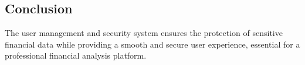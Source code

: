 \subsection{Conclusion}
The user management and security system ensures the protection of sensitive financial data while providing a smooth and secure user experience, essential for a professional financial analysis platform.
